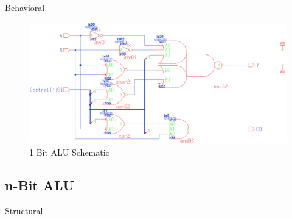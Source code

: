 \documentclass[11pt]{article}
\begin{document}
		Behavioral
		
		\begin{figure}[H]
			\centering
			\includegraphics[width=0.7\linewidth]{"Pictures/ALU-1Bit Schematic"}
			\caption{1 Bit ALU Schematic}
			\label{fig:alu-1bit-schematic}
		\end{figure}
		

	\subsection{n-Bit ALU}
	
		Structural
		
\end{document}
